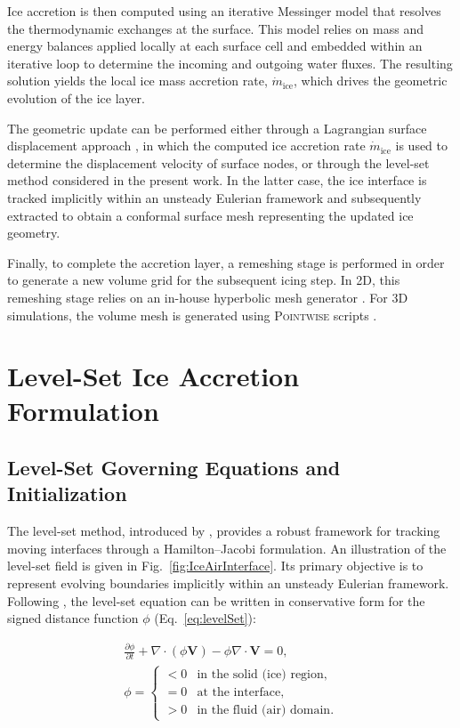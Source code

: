 Ice accretion is then computed using an iterative Messinger model \cite{Zhu_2014} that resolves the thermodynamic exchanges at the surface. This model relies on mass and energy balances applied locally at each surface cell and embedded within an iterative loop to determine the incoming and outgoing water fluxes. The resulting solution yields the local ice mass accretion rate, $\dot{m}_{\text{ice}}$, which drives the geometric evolution of the ice layer.

The geometric update can be performed either through a Lagrangian surface displacement approach \cite{thompsonDeformation}, in which the computed ice accretion rate $\dot{m}_{\text{ice}}$ is used to determine the displacement velocity of surface nodes, or through the level-set method \cite{OSHER2004} considered in the present work. In the latter case, the ice interface is tracked implicitly within an unsteady Eulerian framework and subsequently extracted to obtain a conformal surface mesh representing the updated ice geometry.

Finally, to complete the accretion layer, a remeshing stage is performed in order to generate a new volume grid for the subsequent icing step. In 2D, this remeshing stage relies on an in-house hyperbolic mesh generator \cite{bourgault2019ice}. For 3D simulations, the volume mesh is generated using \textsc{Pointwise} scripts \cite{fidelity_pointwise_2025}.


\section{Level-Set Ice Accretion Formulation}
\label{sec:level_set_formulation}

\subsection{Level-Set Governing Equations and Initialization}
\label{subsec:levelset_governing}

The level-set method, introduced by \cite{OSHER198812}, provides a robust framework for tracking moving interfaces through a Hamilton--Jacobi formulation. An illustration of the level-set field is given in Fig.~\ref{fig:IceAirInterface}. Its primary objective is to represent evolving boundaries implicitly within an unsteady Eulerian framework. Following \cite{FROLKOVIC2015214}, the level-set equation can be written in conservative form for the signed distance function $\phi$ (Eq.~\ref{eq:levelSet}):

\begin{equation}
\begin{gathered}
\frac{\partial \phi}{\partial t} 
+ \nabla \cdot (\phi \boldsymbol{V})  
- \phi \nabla \cdot \boldsymbol{V} = 0, \\[6pt]
\phi =
\begin{cases}
< 0 & \text{in the solid (ice) region}, \\
= 0 & \text{at the interface}, \\
> 0 & \text{in the fluid (air) domain}.
\end{cases}
\end{gathered}
\label{eq:levelSet}
\end{equation}

